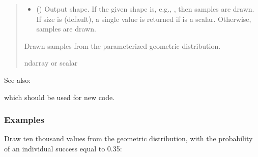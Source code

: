 \documentclass[letterpaper,10pt,english]{sphinxmanual}
\begin{document}
\begin{fulllineitems}
\begin{quote}
\begin{description}
\begin{itemize}
\item {} 
\sphinxAtStartPar
{} (\sphinxstyleliteralemphasis{\sphinxupquote{, }}) \textendash{} Output shape.  If the given shape is, e.g., , then
 samples are drawn.  If size is  (default),
a single value is returned if  is a scalar.  Otherwise,
 samples are drawn.

\end{itemize}

\sphinxAtStartPar
{} \textendash{} Drawn samples from the parameterized geometric distribution.

\sphinxAtStartPar
ndarray or scalar

\end{description}\end{quote}


\begin{sphinxseealso}{See also:}
\begin{description}
\sphinxAtStartPar
which should be used for new code.

\end{description}


\end{sphinxseealso}

\subsubsection*{Examples}

\sphinxAtStartPar
Draw ten thousand values from the geometric distribution,
with the probability of an individual success equal to 0.35:

\begin{sphinxVerbatim}[commandchars=\\\{\}]
   
\end{sphinxVerbatim}


\end{fulllineitems}
\end{document}
